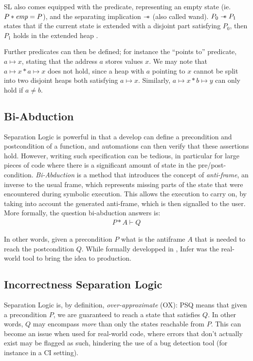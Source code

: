 SL also comes equipped with the \emp{} predicate, representing an empty state (ie. $P * \textit{emp} = P$), and the separating implication $\mathrel{-\!\!\ast}$ (also called wand). $P_0 \mathrel{-\!\!\ast} P_1$ states that if the current state is extended with a disjoint part satisfying $P_0$, then $P_1$ holds in the extended heap \cite{seplogic2}.

Further predicates can then be defined; for instance the ``points to'' predicate, $a \mapsto x$, stating that the address $a$ stores values $x$. We may note that $a \mapsto x * a \mapsto x$ does not hold, since a heap with $a$ pointing to $x$ cannot be split into two disjoint heaps both satisfying $a \mapsto x$. Similarly, $a\mapsto x * b \mapsto y$ can only hold if $a\neq b$.

\subsection{Bi-Abduction}

Separation Logic is powerful in that a develop can define a precondition and postcondition of a function, and automations can then verify that these assertions hold. However, writing such specification can be tedious, in particular for large pieces of code where there is a significant amount of state in the pre/post-condition. \emph{Bi-Abduction} \cite{biabduction} is a method that introduces the concept of \emph{anti-frame}, an inverse to the usual frame, which represents missing parts of the state that were encountered during symbolic execution. This allows the execution to carry on, by taking into account the generated anti-frame, which is then signalled to the user. More formally, the question bi-abduction answers is:
\begin{align*}
	P * A \vdash Q
\end{align*}

In other words, given a precondition $P$ what is the antiframe $A$ that is needed to reach the postcondition $Q$. While formally developped in \cite{biabduction}, Infer \cite{infer} was the real-world tool to bring the idea to production.

\subsection{Incorrectness Separation Logic}

Separation Logic is, by definition, \emph{over-approximate} (OX): \SLtriple PSQ means that given a precondition $P$, we are guaranteed to reach a state that satisfies $Q$. In other words, $Q$ may encompass \emph{more} than only the states reachable from $P$. This can become an issue when used for real-world code, where errors that don't actually exist may be flagged as such, hindering the use of a bug detection tool (for instance in a CI setting).

